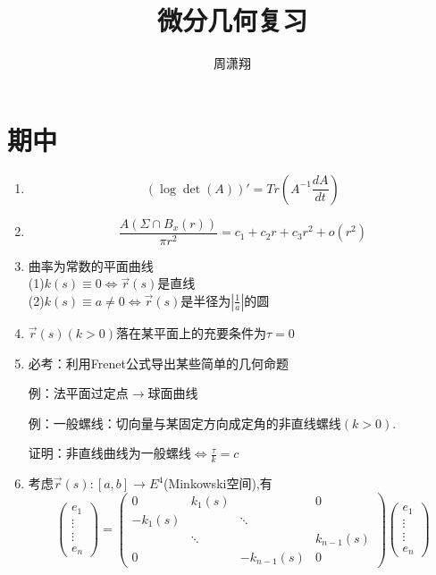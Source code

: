 \documentclass{ctexart}
\begin{document}
	
	\title{微分几何复习} %
	
	\author{周潇翔} %
	
	
	
	\maketitle %
	
	
	
\section{期中}
\begin{enumerate}
	

	\item	$$(\log \det (A))' = Tr (A^{-1} \frac{dA}{dt})$$
		
	\item	$$\frac{A(\Sigma \cap B_x(r))}{\pi r^2}=c_1+c_2 r+c_3 r^2+o(r^2)$$

\item 曲率为常数的平面曲线 \\
(1)$k(s)\equiv 0 \Leftrightarrow \vec{r}(s)$是直线\\
(2)$k(s)\equiv a \neq 0 \Leftrightarrow \vec{r}(s)$是半径为$|\frac{1}{a}|$的圆

\item$\vec{r}(s)(k>0)$落在某平面上的充要条件为$\tau =0$

\item 必考：利用Frenet公式导出某些简单的几何命题

例：法平面过定点$\rightarrow$球面曲线

例：一般螺线：切向量与某固定方向成定角的非直线螺线$(k>0)$.

证明：非直线曲线为一般螺线$\Leftrightarrow \frac{\tau}{k}=c
$

\item 考虑$\vec{r}(s):[a,b]\rightarrow E^4$(Minkowski空间),有
$$\begin{pmatrix}
e_1\\ \vdots\\ \vdots \\ e_n
\end{pmatrix}=\begin{pmatrix}
0 & k_1(s) & & 0\\
-k_1(s) &&\ddots&\\
& \ddots &&k_{n-1}(s)\\
0& & -k_{n-1}(s)& 0
\end{pmatrix}
\begin{pmatrix}
e_1\\ \vdots\\ \vdots \\ e_n
\end{pmatrix}$$


\end{enumerate}
\end{document}
